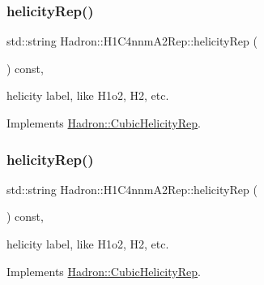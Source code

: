 \mbox{\label{structHadron_1_1H1C4nnmA2Rep_abbeab2e3b048d09ea64582a68a2180a5}} 
\subsubsection{\texorpdfstring{helicityRep()}{helicityRep()}\hspace{0.1cm}{\footnotesize\ttfamily [1/2]}}
{\footnotesize\ttfamily std\+::string Hadron\+::\+H1\+C4nnm\+A2\+Rep\+::helicity\+Rep (\begin{DoxyParamCaption}{ }\end{DoxyParamCaption}) const\hspace{0.3cm}{\ttfamily [inline]}, {\ttfamily [virtual]}}

helicity label, like H1o2, H2, etc. 

Implements \mbox{\hyperlink{structHadron_1_1CubicHelicityRep_af1096946b7470edf0a55451cc662f231}{Hadron\+::\+Cubic\+Helicity\+Rep}}.

\mbox{\label{structHadron_1_1H1C4nnmA2Rep_abbeab2e3b048d09ea64582a68a2180a5}} 
\subsubsection{\texorpdfstring{helicityRep()}{helicityRep()}\hspace{0.1cm}{\footnotesize\ttfamily [2/2]}}
{\footnotesize\ttfamily std\+::string Hadron\+::\+H1\+C4nnm\+A2\+Rep\+::helicity\+Rep (\begin{DoxyParamCaption}{ }\end{DoxyParamCaption}) const\hspace{0.3cm}{\ttfamily [inline]}, {\ttfamily [virtual]}}

helicity label, like H1o2, H2, etc. 

Implements \mbox{\hyperlink{structHadron_1_1CubicHelicityRep_af1096946b7470edf0a55451cc662f231}{Hadron\+::\+Cubic\+Helicity\+Rep}}.

\mbox{\label{structHadron_1_1H1C4nnmA2Rep_a1f403babca36b3e12ab4f6a84e0b0bfd}} 
